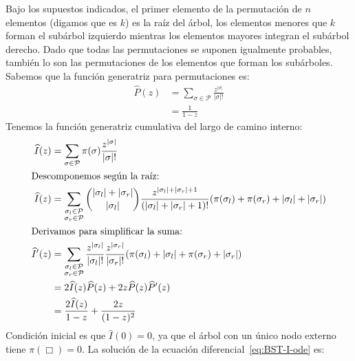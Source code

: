   Bajo los supuestos indicados,
  el primer elemento de la permutación de \(n\) elementos
  (digamos que es \(k\))
  es la raíz del árbol,
  los elementos menores que \(k\) forman el subárbol izquierdo
  mientras los elementos mayores integran el subárbol derecho.
  Dado que todas las permutaciones se suponen igualmente probables,
  también lo son
  las permutaciones de los elementos que forman los subárboles.
  Sabemos que la función generatriz para permutaciones es:
  \begin{align}
    \widehat{P}(z)
      &= \sum_{\sigma \in \mathcal{P}}
	   \frac{z^{\lvert \sigma \rvert}}{\lvert \sigma \rvert !}
	      \label{eq:P-def} \\
      &= \frac{1}{1 - z}
	      \label{eq:P-explicit}
  \end{align}
  Tenemos la función generatriz cumulativa del largo de camino interno:
  \begin{align}
    \widehat{I}(z)
      &= \sum_{\sigma \in \mathcal{P}}
	   \pi(\sigma)
	   \frac{z^{\lvert \sigma \rvert}}{\lvert \sigma \rvert !}
	      \label{eq:BST-I-def} \\
  \intertext{Descomponemos según la raíz:}
    \widehat{I}(z)
      &= \sum_{\substack{\sigma_l \in \mathcal{P} \\
			 \sigma_r \in \mathcal{P}}}
	   \binom{\lvert \sigma_l \rvert + \lvert \sigma_r \lvert}
		 {\lvert \sigma_l \rvert}
	   \frac{z^{\lvert \sigma_l \rvert + \lvert \sigma_r \rvert + 1}}
		{(\lvert \sigma_l \rvert + \lvert \sigma_r \rvert + 1)!}
	   (\pi(\sigma_l) + \pi(\sigma_r)
	      + \lvert \sigma_l \rvert + \lvert \sigma_r \rvert)
	      \label{eq:BST-I-decomposed} \\
  \intertext{Derivamos para simplificar la suma:}
    \widehat{I}'(z)
      &= \sum_{\substack{\sigma_l \in \mathcal{P} \notag \\
			 \sigma_r \in \mathcal{P}}}
	   \frac{z^{\lvert \sigma_l \rvert}}{\lvert \sigma_l \rvert !}
	   \frac{z^{\lvert \sigma_r \rvert}}{\lvert \sigma_r \rvert !}
	   (\pi(\sigma_l) + \lvert \sigma_l \rvert
	      + \pi(\sigma_r) + \lvert \sigma_r \rvert) \\
      &= 2 \widehat{I}(z) \widehat{P}(z)
	   + 2 z \widehat{P}(z) \widehat{P}'(z) \notag \\
      &= \frac{2 \widehat{I}(z)}{1 - z} + \frac{2 z}{(1 - z)^2}
	      \label{eq:BST-I-ode}
  \end{align}
  Condición inicial es que \(\widehat{I}(0) = 0\),
  ya que el árbol con un único nodo externo tiene \(\pi(\Box) = 0\).
  La solución de la ecuación diferencial~\eqref{eq:BST-I-ode} es:
